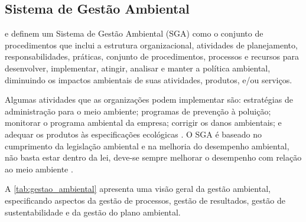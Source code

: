 \subsection{Sistema de Gestão Ambiental}

 e  definem um Sistema de Gestão Ambiental (SGA) como o conjunto de procedimentos que inclui a estrutura organizacional, atividades de planejamento, responsabilidades, práticas, conjunto de procedimentos, processos e recursos para desenvolver, implementar, atingir, analisar e manter a política ambiental, diminuindo os impactos ambientais de suas atividades, produtos, e/ou serviços.

Algumas atividades que as organizações podem implementar são: estratégias de administração para o meio ambiente; programas de prevenção à poluição; monitorar o programa ambiental da empresa; corrigir os danos ambientais; e adequar os produtos às especificações ecológicas \cite{tinoco2006contabilidade}. O SGA é baseado no cumprimento da legislação ambiental e na melhoria do desempenho ambiental, não basta estar dentro da lei, deve-se sempre melhorar o desempenho com relação ao meio ambiente .

A \autoref{tab:gestao_ambiental} apresenta uma visão geral da gestão ambiental, especificando aspectos da gestão de processos, gestão de resultados, gestão de sustentabilidade e da gestão do plano ambiental.

